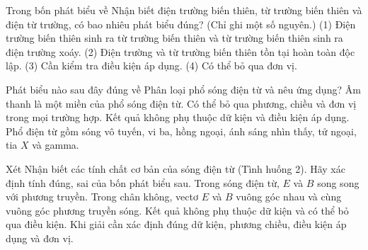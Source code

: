 \begin{ex}
Trong bốn phát biểu về Nhận biết điện trường biến thiên, từ trường biến thiên và điện từ trường, có bao nhiêu phát biểu đúng? (Chỉ ghi một số nguyên.) (1) Điện trường biến thiên sinh ra từ trường biến thiên và từ trường biến thiên sinh ra điện trường xoáy. (2) Điện trường và từ trường biến thiên tồn tại hoàn toàn độc lập. (3) Cần kiểm tra điều kiện áp dụng. (4) Có thể bỏ qua đơn vị.
\end{ex}

\begin{ex}
Phát biểu nào sau đây đúng về Phân loại phổ sóng điện từ và nêu ứng dụng?
\choice
{Âm thanh là một miền của phổ sóng điện từ.}
{Có thể bỏ qua phương, chiều và đơn vị trong mọi trường hợp.}
{Kết quả không phụ thuộc dữ kiện và điều kiện áp dụng.}
{\True Phổ điện từ gồm sóng vô tuyến, vi ba, hồng ngoại, ánh sáng nhìn thấy, tử ngoại, tia $X$ và gamma.}
\end{ex}

\begin{ex}
Xét Nhận biết các tính chất cơ bản của sóng điện từ (Tình huống 2). Hãy xác định tính đúng, sai của bốn phát biểu sau.
\choiceTF
{Trong sóng điện từ, $E$ và $B$ song song với phương truyền.}
{\True Trong chân không, vectơ $E$ và $B$ vuông góc nhau và cùng vuông góc phương truyền sóng.}
{Kết quả không phụ thuộc dữ kiện và có thể bỏ qua điều kiện.}
{\True Khi giải cần xác định đúng dữ kiện, phương chiều, điều kiện áp dụng và đơn vị.}
\end{ex}

